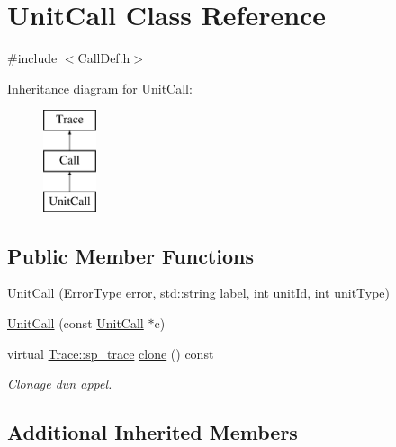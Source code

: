\hypertarget{class_unit_call}{}\section{Unit\+Call Class Reference}
\label{class_unit_call}


{\ttfamily \#include $<$Call\+Def.\+h$>$}

Inheritance diagram for Unit\+Call\+:\begin{figure}[H]
\begin{center}
\leavevmode
\includegraphics[height=3.000000cm]{class_unit_call}
\end{center}
\end{figure}
\subsection*{Public Member Functions}
\begin{DoxyCompactItemize}
\item 
\hyperlink{class_unit_call_ad81db95c527471acbfe40dd2f6b06713}{Unit\+Call} (\hyperlink{class_call_ade833a08ce215aaa4121102f3448c898}{Error\+Type} \hyperlink{class_call_a206f6150a8038fda48c17c2c7421aed1}{error}, std\+::string \hyperlink{class_call_ad6b8343d530798fdb48407b3f2489ae7}{label}, int unit\+Id, int unit\+Type)
\item 
\hyperlink{class_unit_call_a45ff0aedc68def7b44cb4c83252c298c}{Unit\+Call} (const \hyperlink{class_unit_call}{Unit\+Call} $\ast$c)
\item 
virtual \hyperlink{class_trace_a9c58e523529fc8a03fb6acf3eef86150}{Trace\+::sp\+\_\+trace} \hyperlink{class_unit_call_a637d309cd3d0bc05849aa7ca20eb5f89}{clone} () const 
\begin{DoxyCompactList}\small\item\em Clonage d\textquotesingle{}un appel. \end{DoxyCompactList}\end{DoxyCompactItemize}
\subsection*{Additional Inherited Members}


